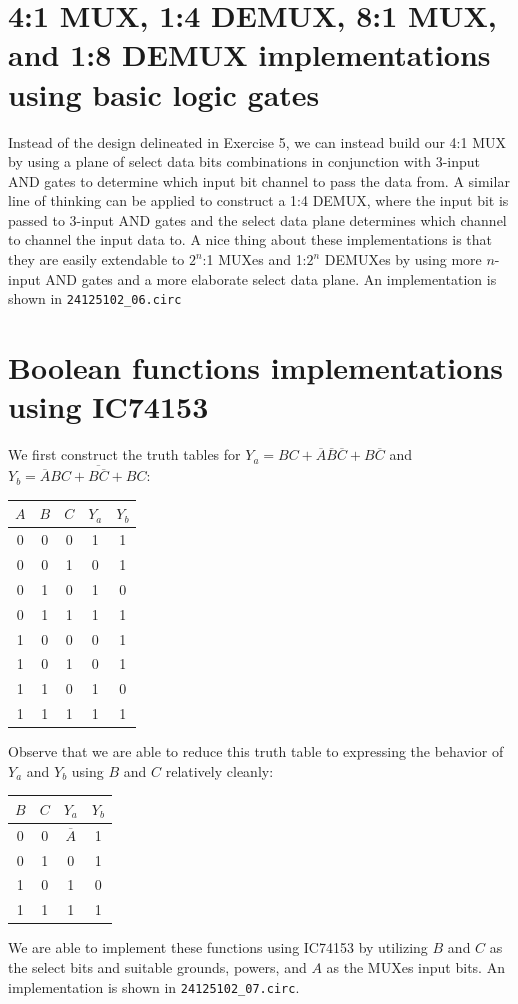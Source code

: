 \documentclass{exam}
\begin{document}
\section{4:1 MUX, 1:4 DEMUX, 8:1 MUX, and 1:8 DEMUX implementations using basic logic gates}
Instead of the design delineated in Exercise 5, we can instead build our 4:1 MUX by using a plane of select data bits combinations in conjunction with 3-input AND gates to determine which input bit channel to pass the data from. A similar line of thinking can be applied to construct a 1:4 DEMUX, where the input bit is passed to 3-input AND gates and the select data plane determines which channel to channel the input data to. A nice thing about these implementations is that they are easily extendable to $2^n$:1 MUXes and 1:$2^n$ DEMUXes by using more $n$-input AND gates and a more elaborate select data plane. An implementation is shown in \verb|24125102_06.circ|

\section{Boolean functions implementations using IC74153}
We first construct the truth tables for $Y_a = BC + \overline A \overline B \overline C + B \overline C$ and $Y_b = \overline ABC + \overline{B \overline C} + BC$:
\begin{center}
	\bgroup
	\def\arraystretch{1.2}
	\begin{tabular}{|ccc|cc|}
		\hline
		$A$ & $B$ & $C$ & $Y_a$ & $Y_b$ \\
		\hline
		0 & 0 & 0 & 1 & 1 \\
		0 & 0 & 1 & 0 & 1 \\
		0 & 1 & 0 &	1 &	0 \\
		0 & 1 & 1 & 1 & 1 \\
		1 & 0 & 0 & 0 &	1 \\
		1 & 0 & 1 & 0 &	1 \\
		1 & 1 & 0 & 1 &	0 \\
		1 & 1 & 1 & 1 & 1 \\
		\hline
	\end{tabular}
	\egroup
\end{center}
Observe that we are able to reduce this truth table to expressing the behavior of $Y_a$ and $Y_b$ using $B$ and $C$ relatively cleanly:
\begin{center}
	\bgroup
	\def\arraystretch{1.2}
	\begin{tabular}{|cc|cc|}
		\hline
		$B$ & $C$ & $Y_a$ & $Y_b$ \\
		\hline
		0 & 0 & $\overline{A}$ & 1 \\
		0 & 1 & 0 & 1 \\
		1 & 0 &	1 &	0 \\
		1 & 1 & 1 & 1 \\
		\hline
	\end{tabular}
	\egroup
\end{center}
We are able to implement these functions using IC74153 by utilizing $B$ and $C$ as the select bits and suitable grounds, powers, and $A$ as the MUXes input bits. An implementation is shown in \verb|24125102_07.circ|.
\end{document}

